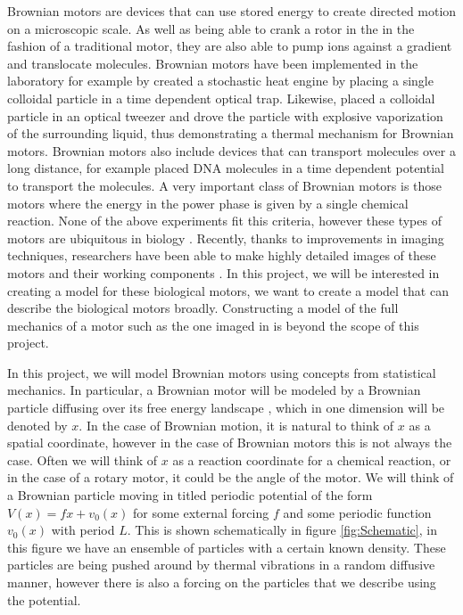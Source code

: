 \documentclass[11pt]{article} %
\begin{document}
Brownian motors are devices that can use stored energy to create directed motion on a microscopic scale. As well as being able to crank a rotor in the in the fashion of a traditional motor, they are also able to pump ions against a gradient and translocate molecules. Brownian motors have been implemented in the laboratory for example by \cite{BlickleBechinger2011} created a stochastic heat engine by placing a single colloidal particle in a time dependent optical trap. Likewise, \cite{Pedro2014} placed a colloidal particle in an optical tweezer and drove the particle with explosive vaporization of the surrounding liquid, thus demonstrating a thermal mechanism for Brownian motors. Brownian motors also include devices that can transport molecules over a long distance, for example \cite{JoelBader1999} placed DNA molecules in a time dependent potential to transport the molecules. A very important class of Brownian motors is those motors where the energy in the power phase is given by a single chemical reaction. None of the above experiments fit this criteria, however these types of motors are ubiquitous in biology \cite{PhillipsQuakeMay2006}. Recently, thanks to improvements in imaging techniques, researchers have been able to make highly detailed images of these motors and their working components \cite{YiWeiChang2016}. In this project, we will be interested in creating a model for these biological motors, we want to create a model that can describe the biological motors broadly. Constructing a model of the full mechanics of a motor such as the one imaged in \cite{YiWeiChang2016} is beyond the scope of this project.

In this project, we will model Brownian motors using concepts from statistical mechanics. In particular, a Brownian motor will be modeled by a Brownian particle diffusing over its free energy landscape \cite{Reimann2001}, which in one dimension will be denoted by $x$. In the case of Brownian motion, it is natural to think of $x$ as a spatial coordinate, however in the case of Brownian motors this is not always the case. Often we will think of $x$ as a reaction coordinate for a chemical reaction, or in the case of a rotary motor, it could be the angle of the motor. We will think of a Brownian particle moving in titled periodic potential of the form $V(x) = f x + v_0(x)$ for some external forcing $f$ and some periodic function $v_0(x)$ with period $L$. This is shown schematically in figure \ref{fig:Schematic}, in this figure we have an ensemble of  particles with a certain known density. These particles are being pushed around by thermal vibrations in a random diffusive manner, however there is also a forcing on the particles that we describe using the potential.
\end{document}
